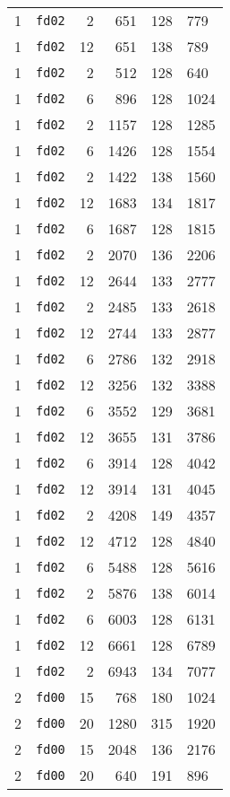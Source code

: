 \documentclass{article}
\begin{document}
\begin{table}[h!]
\begin{tabular}{llrrrl}
    1 & \texttt{fd02} & 2 & 651 & 128 & 779 \\
    1 & \texttt{fd02} & 12 & 651 & 138 & 789 \\
    1 & \texttt{fd02} & 2 & 512 & 128 & 640 \\
    1 & \texttt{fd02} & 6 & 896 & 128 & 1024 \\
    1 & \texttt{fd02} & 2 & 1157 & 128 & 1285 \\
    1 & \texttt{fd02} & 6 & 1426 & 128 & 1554 \\
    1 & \texttt{fd02} & 2 & 1422 & 138 & 1560 \\
    1 & \texttt{fd02} & 12 & 1683 & 134 & 1817 \\
    1 & \texttt{fd02} & 6 & 1687 & 128 & 1815 \\
    1 & \texttt{fd02} & 2 & 2070 & 136 & 2206 \\
    1 & \texttt{fd02} & 12 & 2644 & 133 & 2777 \\
    1 & \texttt{fd02} & 2 & 2485 & 133 & 2618 \\
    1 & \texttt{fd02} & 12 & 2744 & 133 & 2877 \\
    1 & \texttt{fd02} & 6 & 2786 & 132 & 2918 \\
    1 & \texttt{fd02} & 12 & 3256 & 132 & 3388 \\
    1 & \texttt{fd02} & 6 & 3552 & 129 & 3681 \\
    1 & \texttt{fd02} & 12 & 3655 & 131 & 3786 \\
    1 & \texttt{fd02} & 6 & 3914 & 128 & 4042 \\
    1 & \texttt{fd02} & 12 & 3914 & 131 & 4045 \\
    1 & \texttt{fd02} & 2 & 4208 & 149 & 4357 \\
    1 & \texttt{fd02} & 12 & 4712 & 128 & 4840 \\
    1 & \texttt{fd02} & 6 & 5488 & 128 & 5616 \\
    1 & \texttt{fd02} & 2 & 5876 & 138 & 6014 \\
    1 & \texttt{fd02} & 6 & 6003 & 128 & 6131 \\
    1 & \texttt{fd02} & 12 & 6661 & 128 & 6789 \\
    1 & \texttt{fd02} & 2 & 6943 & 134 & 7077 \\
    2 & \texttt{fd00} & 15 & 768 & 180 & 1024 \\
    2 & \texttt{fd00} & 20 & 1280 & 315 & 1920 \\
    2 & \texttt{fd00} & 15 & 2048 & 136 & 2176 \\
    2 & \texttt{fd00} & 20 & 640 & 191 & 896 \\

\end{tabular}
\end{table}
\end{document}

